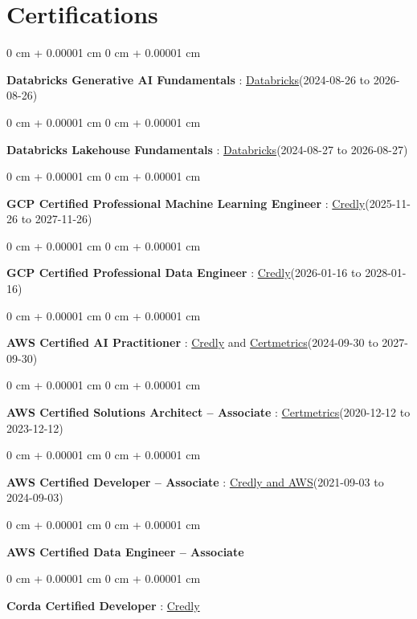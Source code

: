 \documentclass[10pt, letterpaper]{article}
\newenvironment{onecolentry}{
    \begin{adjustwidth}{
        0 cm + 0.00001 cm
    }{
        0 cm + 0.00001 cm
    }
}{
    \end{adjustwidth}
} %
\begin{document}
    \vspace{2 pt }
    \section{Certifications}
        \vspace{2 pt }
        \begin{samepage}
            \begin{onecolentry}
                \textbf{Databricks Generative AI Fundamentals} : \href{https://sgq.io/3uIFGNi}{Databricks}(2024-08-26 to 2026-08-26)
            \end{onecolentry}
            \begin{onecolentry}
                \textbf{Databricks Lakehouse Fundamentals} : \href{https://scl.io/FXGKS0u}{Databricks}(2024-08-27 to 2026-08-27)
            \end{onecolentry}
            \begin{onecolentry}
                \textbf{GCP Certified Professional Machine Learning Engineer} : \href{https://www.credly.com/badges/a6965347-09ea-4d8f-b398-0e151407160d/public_url}{Credly}(2025-11-26 to 2027-11-26)
            \end{onecolentry}
            \begin{onecolentry}
                \textbf{GCP Certified Professional Data Engineer} : \href{https://www.credly.com/badges/977e96d9-12e7-4f6c-b8a7-df71fb7153b8/public_url}{Credly}(2026-01-16 to 2028-01-16)
            \end{onecolentry}
            \begin{onecolentry}
                \textbf{AWS Certified AI Practitioner} : \href{https://www.credly.com/badges/451b7ba5-8be1-4a8e-bbec-ade26627a6b6/public_url}{Credly} and \href{https://cp.certmetrics.com/amazon/en/public/verify/credential/495f0d9853874bf9a33c17f8e89ce131}{Certmetrics}(2024-09-30 to 2027-09-30)
            \end{onecolentry}
            \begin{onecolentry}
                \textbf{AWS Certified Solutions Architect – Associate} : \href{https://cp.certmetrics.com/amazon/en/public/verify/credential/SNBY48EBJJVE1SWX}{Certmetrics}(2020-12-12 to 2023-12-12)
            \end{onecolentry}
            \begin{onecolentry}
                \textbf{AWS Certified Developer – Associate} : \href{https://www.credly.com/badges/b8106fbd-d3d1-4204-8cdf-e708798fd582/public_url}{Credly and AWS}(2021-09-03  to 2024-09-03)
            \end{onecolentry}
            \begin{onecolentry}
                \textbf{AWS Certified Data Engineer – Associate}
            \end{onecolentry}
            \begin{onecolentry}
                \textbf{Corda Certified Developer} : \href{https://www.credly.com/badges/7f29d39c-34b6-4de9-b07d-e10f1090a335/linked_in_profile}{Credly}
            \end{onecolentry}
        \end{samepage}
\end{document}
